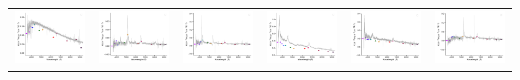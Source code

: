 \begin{center}
\begin{longtable}{l l l l l l }
    \includegraphics[width=0.3\linewidth, clip]{Figs/Figs-sdss/spec-4237-55478-0412-STRIPE82-0049-025567.pdf} & \includegraphics[width=0.3\linewidth, clip]{Figs/Figs-sdss/spec-4240-55455-0669-STRIPE82-0058-035027.pdf} & \includegraphics[width=0.3\linewidth, clip]{Figs/Figs-sdss/spec-4241-55450-0894-STRIPE82-0062-010390.pdf} & \includegraphics[width=0.3\linewidth, clip]{Figs/Figs-sdss/spec-4302-55531-0350-STRIPE82-0012-042042.pdf} & \includegraphics[width=0.3\linewidth, clip]{Figs/Figs-sdss/spec-4344-55557-0830-STRIPE82-0055-005329.pdf} & \includegraphics[width=0.3\linewidth, clip]{Figs/Figs-sdss/spec-4374-55883-0621-SPLUS-s02s02-030289.pdf} \\

\end{longtable}
\end{center}
